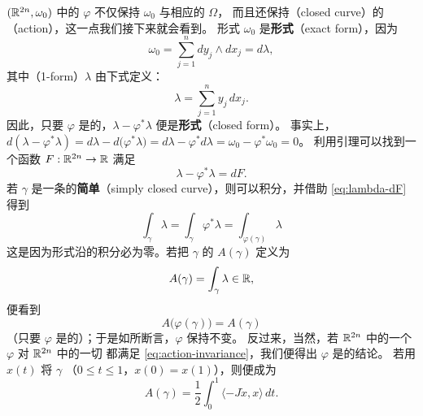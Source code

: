$(\mathbb{R}^{2n},\omega_0)$ 中的\trSymplecticDiffeomorphism{} $\varphi$ 不仅保持 $\omega_0$ 与相应的\trVolumeForm{} $\Omega$，%
而且还保持\textbf{\trClosed\trCurve}（closed curve）的\textbf{\trAction}（action），这一点我们接下来就会看到。%
形式 $\omega_0$ 是\textbf{\trExact{}形式}（exact form），因为
\begin{equation}\label{eq:omega0-exact}
\omega_0=\sum_{j=1}^{n}dy_j\wedge dx_j=d\lambda,
\end{equation}
其中\textbf{\trOneForm}（1-form）$\lambda$ 由下式定义：
\[
\lambda=\sum_{j=1}^{n}y_j\,dx_j.
\]
因此，只要 $\varphi$ 是\trSymplectic{}的，$\lambda-\varphi^{*}\lambda$ 便是\textbf{\trClosed{}形式}（closed form）。%
事实上，$d(\lambda-\varphi^{*}\lambda)=d\lambda-d\bigl(\varphi^{*}\lambda\bigr)=d\lambda-\varphi^{*}d\lambda=\omega_0-\varphi^{*}\omega_0=0$。%
利用\trPoincare{}引理可以找到一个函数 $F:\mathbb{R}^{2n}\to\mathbb{R}$ 满足
\begin{equation}\label{eq:lambda-dF}
\lambda-\varphi^{*}\lambda=dF.
\end{equation}
若 $\gamma$ 是一条\trOriented{}的\textbf{简单\trClosed\trCurve}（simply closed curve），则可以积分，并借助 \eqref{eq:lambda-dF} 得到
\[
\int_{\gamma}\lambda=\int_{\gamma}\varphi^{*}\lambda=\int_{\varphi(\gamma)}\lambda
\]
这是因为\trExact{}形式沿\trClosed\trCurve{}的积分必为零。若把\trClosed\trCurve{} $\gamma$ 的\trAction{} $A(\gamma)$ 定义为
\begin{equation}\label{eq:action-definition}
A(\gamma)=\int_{\gamma}\lambda\in\mathbb{R},
\end{equation}
便看到
\begin{equation}\label{eq:action-invariance}
A\bigl(\varphi(\gamma)\bigr)=A(\gamma)
\end{equation}
（只要 $\varphi$ 是\trSymplectic{}的）；于是如所断言，$\varphi$ 保持\trAction{}不变。%
反过来，当然，若 $\mathbb{R}^{2n}$ 中的一个\trDiffeomorphism{} $\varphi$ 对 $\mathbb{R}^{2n}$ 中的一切\trClosed\trCurve{}%
都满足 \eqref{eq:action-invariance}，我们便得出 $\varphi$ 是\trSymplectic{}的结论。%
若用 $x(t)$ 将 $\gamma$ \trParametrization（$0\leq t\leq1$，$x(0)=x(1)$），则\trAction{}便成为
\begin{equation}\label{eq:action-integral}
A(\gamma)=\frac{1}{2}\int_{0}^{1}\langle-J\dot{x},x\rangle\,dt.
\end{equation}

